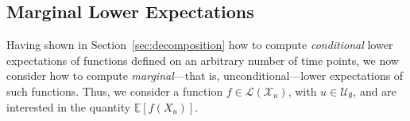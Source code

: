 \documentclass[10pt,a4paper]{paper}
\theoremstyle{definition}
\newtheorem{proposition}[theorem]{Proposition}
\newtheorem{corollary}[theorem]{Corollary}
\newcommand{\reals}{\mathbb{R}}
\newcommand{\realspos}{\reals_{>0}}
\newcommand{\realsnonneg}{\reals_{\geq 0}}
\newcommand{\states}{\mathcal{X}}
\newcommand{\processes}{\mathbb{P}}
\newcommand{\wprocesses}{\processes^{\mathrm{W}}}
\newcommand{\gambles}{\mathcal{L}}
\newcommand{\rateset}{\mathcal{Q}}
\newcommand{\lrate}{\underline{Q}}
\newcommand{\norm}[1]{\left\lVert #1 \right\rVert}
\begin{document}
%
%

\subsection{Marginal Lower Expectations}\label{sec:marginal_lower_exp}

Having shown in Section~\ref{sec:decomposition} how to compute \emph{conditional} lower expectations of functions defined on an arbitrary number of time points, we now consider how to compute \emph{marginal}---that is, unconditional---lower expectations of such functions. Thus, we consider a function $f\in\gambles(\states_u)$, with $u\in\mathcal{U}_{\emptyset}$, and are interested in the quantity $\underline{\mathbb{E}}[f(X_u)]$.
\end{document}
